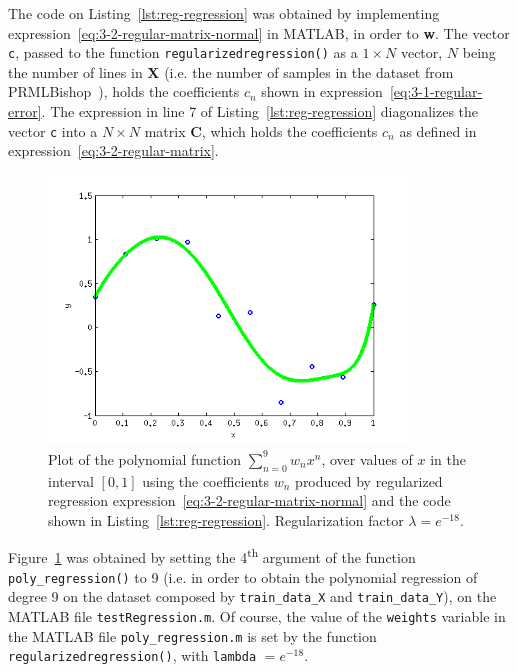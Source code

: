 \documentclass[paper=a4, fontsize=11pt]{scrartcl} %
\numberwithin{equation}{section} %
\numberwithin{figure}{section} %
\numberwithin{table}{section} %
\newcommand{\vertbreak}{\vspace{1.75 mm}}
\begin{document}
The code on Listing~\ref{lst:reg-regression} was obtained by implementing 
expression~\ref{eq:3-2-regular-matrix-normal} in MATLAB, in order to 
\textbf{w}. The vector \verb?c?, passed to the function 
\verb?regularizedregression()? as a $1 \times N$ vector, $N$ being the number 
of lines in \textbf{X} (i.e. the number of samples in the dataset from PRMLBishop~\cite{Bishop2006}), 
holds the coefficients $c_n$ shown in expression~\ref{eq:3-1-regular-error}. The 
expression in line 7 of Listing~\ref{lst:reg-regression} diagonalizes the 
vector \verb?c? into a $N \times N$ matrix \textbf{C}, which holds the 
coefficients $c_n$ as defined in 
expression~\ref{eq:3-2-regular-matrix}.\vertbreak

\begin{figure}[H]

    \centering
    \includegraphics[width=0.85\textwidth]{figures/3-3.png}
    \caption{Plot of the polynomial function $\sum_{n=0}^{9} w_n x^{n}$, over 
            values of $x$ in the interval $[0,1]$  using the coefficients $w_n$ 
            produced by regularized regression 
            expression~\ref{eq:3-2-regular-matrix-normal} and the code 
            shown in Listing~\ref{lst:reg-regression}. Regularization 
            factor $\lambda = e^{-18}$.}
    \label{fig:3-3}

\end{figure}

Figure~\ref{fig:3-3} was obtained by setting the 4\textsuperscript{th} argument 
of the function \verb?poly_regression()? to 9 (i.e. in order to obtain 
the polynomial regression of degree 9 on the dataset composed by 
\verb?train_data_X? and \verb?train_data_Y?), on the MATLAB 
file \verb?testRegression.m?. Of course, the value of the \verb?weights? 
variable in the MATLAB file \verb?poly_regression.m? is set by the function 
\verb?regularizedregression()?, with \verb?lambda? $= e^{-18}$.\\



\end{document}
